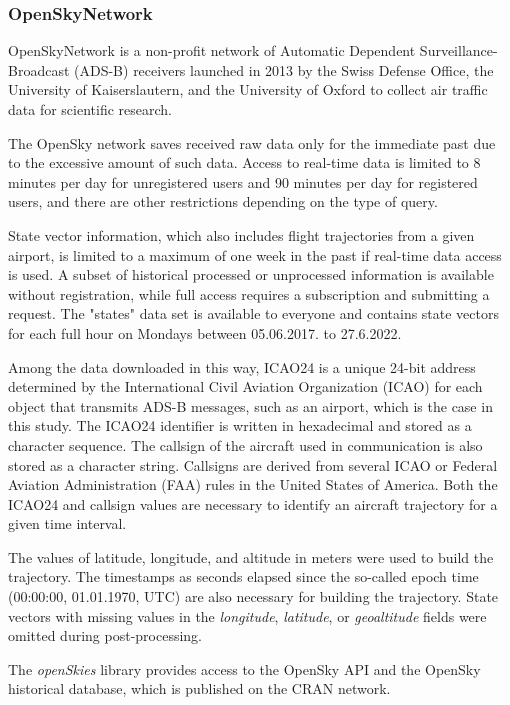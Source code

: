 \let\LaTeXcline\cline\documentclass[sn-mathphys-num]{sn-jnl}\let\cline\LaTeXcline
\begin{document}
\subsubsection{OpenSkyNetwork}

OpenSkyNetwork is a non-profit network of Automatic Dependent Surveillance-Broadcast (ADS-B) receivers launched in 2013 by the Swiss Defense Office, the University of Kaiserslautern, and the University of Oxford to collect air traffic data for scientific research.

The OpenSky network saves received raw data only for the immediate past due to the excessive amount of such data. Access to real-time data is limited to 8 minutes per day for unregistered users and 90 minutes per day for registered users, and there are other restrictions depending on the type of query.
 
State vector information, which also includes flight trajectories from a given airport, is limited to a maximum of one week in the past if real-time data access is used. A subset of historical processed or unprocessed information is available without registration, while full access requires a subscription and submitting a request. The "states" data set is available to everyone and contains state vectors for each full hour on Mondays between 05.06.2017. to 27.6.2022.

Among the data downloaded in this way, ICAO24 is a unique 24-bit address determined by the International Civil Aviation Organization (ICAO) for each object that transmits ADS-B messages, such as an airport, which is the case in this study. The ICAO24 identifier is written in hexadecimal and stored as a character sequence. The callsign of the aircraft used in communication is also stored as a character string. Callsigns are derived from several ICAO or Federal Aviation Administration (FAA) rules in the United States of America. Both the ICAO24 and callsign values are necessary to identify an aircraft trajectory for a given time interval.

The values of latitude, longitude, and altitude in meters were used to build the trajectory. The timestamps as seconds elapsed since the so-called epoch time (00:00:00, 01.01.1970, UTC) are also necessary for building the trajectory. State vectors with missing values in the \textit{longitude}, \textit{latitude}, or \textit{geoaltitude} fields were omitted during post-processing.

The \textit{openSkies} library provides access to the OpenSky API and the OpenSky historical database, which is published on the CRAN network.
\end{document}

